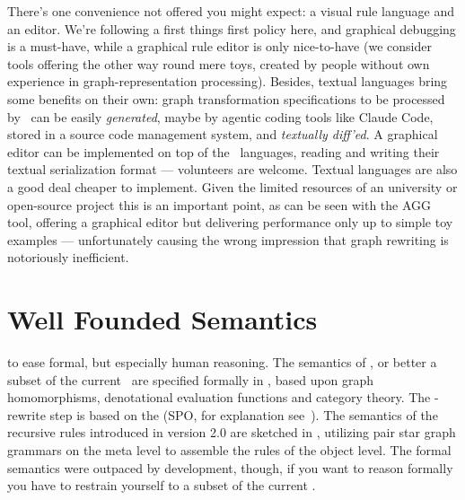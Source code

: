 There's one convenience not offered you might expect: a visual rule language and an editor.
We're following a first things first policy here, and graphical debugging is a must-have, while a graphical rule editor is only nice-to-have 
(we consider tools offering the other way round mere toys, created by people without own experience in graph-representation processing).
Besides, textual languages bring some benefits on their own: graph transformation specifications to be processed by \GrG\ can be easily \emph{generated}, maybe by agentic coding tools like Claude Code\cite{claudecode}, stored in a source code management system, and \emph{textually diff'ed}.
A graphical editor can be implemented on top of the \GrG\ languages, reading and writing their textual serialization format --- volunteers are welcome.
Textual languages are also a good deal cheaper to implement.
Given the limited resources of an university or open-source project this is an important point,
as can be seen with the AGG\cite{agg} tool, offering a graphical editor but delivering performance only up to simple toy examples
--- unfortunately causing the wrong impression that graph rewriting is notoriously inefficient.

\section{Well Founded Semantics}
to ease formal, but especially human reasoning.
The semantics of \GrG, or better a subset of the current \GrG\ are specified formally in \cite{DissRuby}, based upon graph homomorphisms, denotational evaluation functions and category theory.
The \GrG-rewrite step is based on the  (SPO, for explanation see~\cite{spoapproach}).
The semantics of the recursive rules introduced in version 2.0 are sketched in \cite{Jak:08},
utilizing pair star graph grammars on the meta level to assemble the rules of the object level.
The formal semantics were outpaced by development, though, if you want to reason formally you have to restrain yourself to a subset of the current \GrG.

